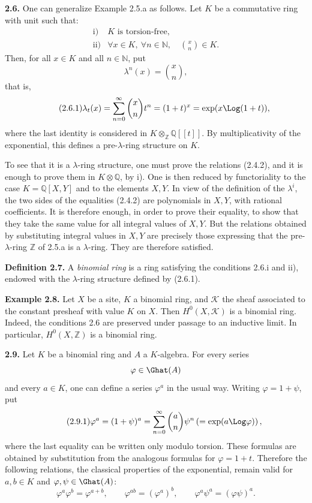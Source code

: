 \textbf{2.6.} One can generalize Example 2.5.a as follows. Let \(K\) be a commutative ring with unit such that:
\[
\begin{array}{ll}
\text{i)}& K\text{ is torsion-free},\\
\text{ii)}& \forall x\in K,\ \forall n\in\mathbb N,\quad \binom{x}{n}\in K .
\end{array}
\]
Then, for all \(x\in K\) and all \(n\in\mathbb N\), put
\[
  \lambda^n(x)=\binom{x}{n},
\]
that is,
\begin{equation}\tag{2.6.1}
  \lambda_t(x)=\sum_{n=0}^{\infty}\binom{x}{n}t^n
  =(1+t)^x=\exp(x\Log(1+t)),
\end{equation}
where the last identity is considered in \(K\otimes_{\mathbb Z}\mathbb Q[[t]]\). By multiplicativity of the exponential, this defines a pre-\(\lambda\)-ring structure on \(K\).

To see that it is a \(\lambda\)-ring structure, one must prove the relations (2.4.2), and it is enough to prove them in \(K\otimes\mathbb Q\), by i). One is then reduced by functoriality to the case \(K=\mathbb Q[X,Y]\) and to the elements \(X,Y\). In view of the definition of the \(\lambda^i\), the two sides of the equalities (2.4.2) are polynomials in \(X,Y\), with rational coefficients. It is therefore enough, in order to prove their equality, to show that they take the same value for all integral values of \(X,Y\). But the relations obtained by substituting integral values in \(X,Y\) are precisely those expressing that the pre-\(\lambda\)-ring \(\mathbb Z\) of 2.5.a is a \(\lambda\)-ring. They are therefore satisfied.

\textbf{Definition 2.7.} A \emph{binomial ring} is a ring satisfying the conditions 2.6.i and ii), endowed with the \(\lambda\)-ring structure defined by (2.6.1).

\textbf{Example 2.8.} Let \(X\) be a site, \(K\) a binomial ring, and \(\mathcal K\) the sheaf associated to the constant presheaf with value \(K\) on \(X\). Then \(H^0(X,\mathcal K)\) is a binomial ring. Indeed, the conditions 2.6 are preserved under passage to an inductive limit. In particular, \(H^0(X,\mathbb Z)\) is a binomial ring.

\textbf{2.9.} Let \(K\) be a binomial ring and \(A\) a \(K\)-algebra. For every series
\[
  \varphi\in\Ghat(A)
\]
and every \(a\in K\), one can define a series \(\varphi^a\) in the usual way. Writing \(\varphi=1+\psi\), put
\begin{equation}\tag{2.9.1}
  \varphi^a=(1+\psi)^a
  =
  \sum_{n=0}^{\infty}\binom{a}{n}\psi^n
  \left(=\exp(a\Log\varphi)\right),
\end{equation}
where the last equality can be written only modulo torsion. These formulas are obtained by substitution from the analogous formulas for \(\varphi=1+t\). Therefore the following relations, the classical properties of the exponential, remain valid for \(a,b\in K\) and \(\varphi,\psi\in\Ghat(A)\):
\begin{equation}\tag{2.9.2}
  \varphi^a\varphi^b=\varphi^{a+b},\qquad
  \varphi^{ab}=(\varphi^a)^b,\qquad
  \varphi^a\psi^a=(\varphi\psi)^a .
\end{equation}



